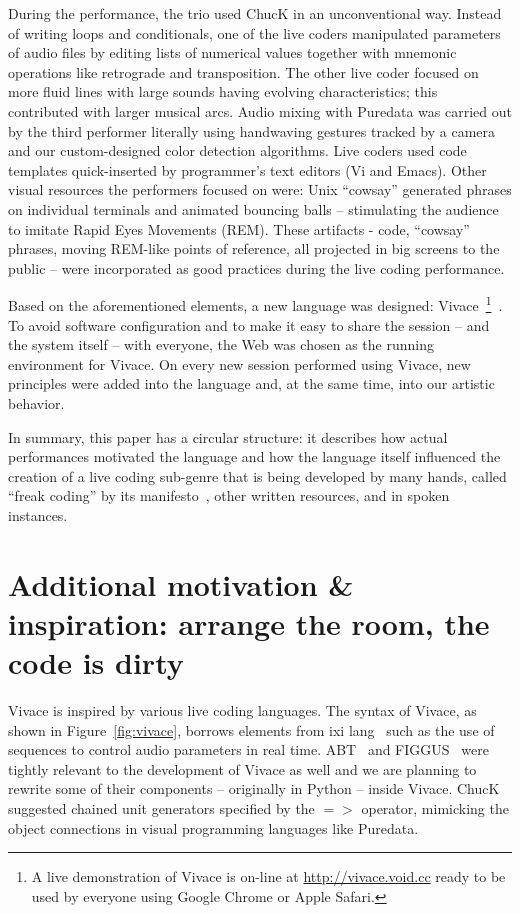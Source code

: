 \documentclass[letterpaper, 12pt]{article}
\begin{document}
During the performance, the trio used ChucK in an unconventional
way. Instead of writing loops and conditionals, one of the live coders
manipulated parameters of audio files by editing lists of numerical
values together with mnemonic operations like retrograde and
transposition.  The other live coder focused on more fluid lines with
large sounds having evolving characteristics; this contributed with
larger musical arcs.  Audio mixing with Puredata was carried out by the
third performer literally using handwaving gestures tracked by a camera and
our custom-designed color detection algorithms. Live coders used code
templates quick-inserted by programmer's text editors (Vi and Emacs). Other visual
resources the performers focused on were: Unix ``cowsay'' generated phrases on
individual terminals and animated bouncing balls -- stimulating the audience to
imitate Rapid Eyes Movements (REM). These artifacts - code, ``cowsay'' phrases,
moving REM-like points of reference, all projected in big screens to the public
-- were incorporated as good practices during the live coding performance.

Based on the aforementioned elements, a new language was designed:
Vivace~\footnote{A live demonstration of Vivace is on-line at
  \url{http://vivace.void.cc} ready to be used by everyone using
  Google Chrome or Apple Safari.}~\citep*{Vivace}.  To avoid software
configuration and to make it easy to share the session -- and the system
itself -- with everyone, the Web was chosen as the running
environment for Vivace. On every new session performed using Vivace,
new principles were added into the language and, at the same time,
into our artistic behavior.

In summary, this paper has a circular structure: it describes how actual performances
motivated the language and how the language itself influenced the
creation of a live coding sub-genre that is being developed by many
hands, called ``freak coding'' by its manifesto~\citep*{freak}, other
written resources, and in spoken instances.

\parskip 18pt

\section{Additional motivation \& inspiration: arrange the room, the code is dirty}

Vivace is inspired by various live coding languages. The syntax of
Vivace, as shown in Figure~\ref{fig:vivace}, borrows elements from ixi
lang~\citep{magnusson2011ixi} such as the use of sequences to control
audio parameters in real time. ABT~\citep{fabbri} and
FIGGUS~\citep{fabbri2} were tightly relevant to the development of
Vivace as well and we are planning to rewrite some of their components
-- originally in Python -- inside Vivace. ChucK suggested chained unit
generators specified by the $=>$ operator, mimicking the object
connections in visual programming languages like Puredata.
\end{document}
